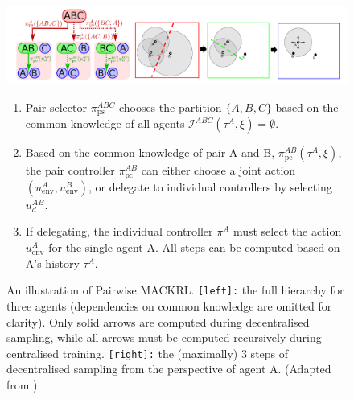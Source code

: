 \begin{figure}[H]
    \centering
    \includegraphics[width=\linewidth]{img_pfe/MACKRL_arch.PNG}
    
    \caption{An illustration of Pairwise MACKRL. 
    \texttt{[left]:} the full hierarchy for three agents (dependencies on common knowledge are omitted for clarity). Only solid arrows are computed during decentralised sampling, while all arrows must be computed recursively during centralised training. 
    \texttt{[right]:} the (maximally) 3 steps of decentralised sampling from the perspective of agent A. 
    (Adapted from \parencite{mackrl})}
    \label{fig:mackrl_arch}

    \begin{minipage}{\linewidth}
    \begin{enumerate}
        \item Pair selector $\pi_{\text{ps}}^{ABC}$ chooses the partition $\{A,B,C\}$ based on the common knowledge of all agents $\mathcal{I}^{ABC}(\tau^A, \xi) = \emptyset$.
        \item Based on the common knowledge of pair A and B, $\pi_{\text{pc}}^{AB}(\tau^A, \xi)$, the pair controller $\pi_{\text{pc}}^{AB}$ can either choose a joint action $(u_{\text{env}}^A, u_{\text{env}}^B)$, or delegate to individual controllers by selecting $u_d^{AB}$.
        \item If delegating, the individual controller $\pi^A$ must select the action $u_{\text{env}}^A$ for the single agent A. All steps can be computed based on A's history $\tau^A$.
    \end{enumerate}
    \end{minipage}

\end{figure}

